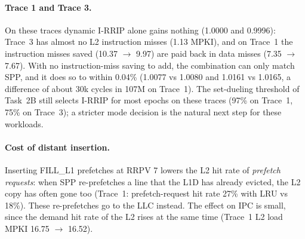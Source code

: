 \paragraph{Trace 1 and Trace 3.} On these traces dynamic I-RRIP alone gains nothing (1.0000 and 0.9996):
Trace~3 has almost no L2 instruction misses (1.13 MPKI), and on Trace~1 the instruction misses saved
(10.37 $\rightarrow$ 9.97) are paid back in data misses (7.35 $\rightarrow$ 7.67). With no instruction-miss
saving to add, the combination can only match SPP, and it does so to within 0.04\%
(1.0077 vs 1.0080 and 1.0161 vs 1.0165, a difference of about 30k cycles in 107M on Trace~1).
The set-dueling threshold of Task~2B still selects I-RRIP for most epochs on these traces
(97\% on Trace~1, 75\% on Trace~3); a stricter mode decision is the natural next step for these
workloads.

\paragraph{Cost of distant insertion.} Inserting FILL\_L1 prefetches at RRPV 7 lowers the L2 hit rate of
\emph{prefetch requests}: when SPP re-prefetches a line that the L1D has already evicted, the L2 copy has
often gone too (Trace~1: prefetch-request hit rate 27\% with LRU vs 18\%). These re-prefetches go to
the LLC instead. The effect on IPC is small, since the demand hit rate of the L2 rises at the same
time (Trace~1 L2 load MPKI 16.75 $\rightarrow$ 16.52).
